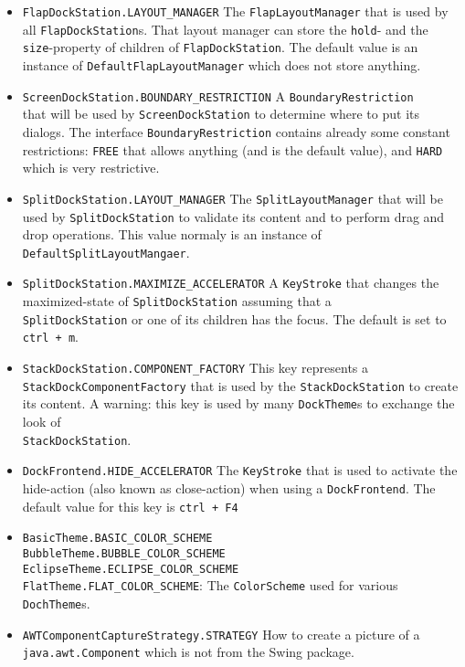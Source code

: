 \documentclass[a4paper,10pt]{article}
\newcommand{\src}[1]{\lstinline[basicstyle=\normalsize\ttfamily,keywordstyle=\normalsize\ttfamily,identifierstyle=\normalsize\ttfamily]|#1|}
\begin{document}
\begin{itemize}
\item \src{FlapDockStation.LAYOUT_MANAGER} The \src{FlapLayoutManager} that is used by all \src{FlapDockStation}s. That layout manager can store the \src{hold}- and the \src{size}-property of children of \src{FlapDockStation}. The default value is an instance of \src{DefaultFlapLayoutManager} which does not store anything.
\item \src{ScreenDockStation.BOUNDARY_RESTRICTION} A \src{BoundaryRestriction} \\that will be used by \src{ScreenDockStation} to determine where to put its dialogs. The interface \src{BoundaryRestriction} contains already some constant restrictions: \src{FREE} that allows anything (and is the default value), and \src{HARD} which is very restrictive.
\item \src{SplitDockStation.LAYOUT_MANAGER} The \src{SplitLayoutManager} that will be used by \src{SplitDockStation} to validate its content and to perform drag and drop operations. This value normaly is an instance of \\\src{DefaultSplitLayoutMangaer}. 
\item \src{SplitDockStation.MAXIMIZE_ACCELERATOR} A \src{KeyStroke} that changes the maximized-state of \src{SplitDockStation} assuming that a \\\src{SplitDockStation} or one of its children has the focus. The default is set to \src{ctrl + m}.
\item \src{StackDockStation.COMPONENT_FACTORY} This key represents a \\\src{StackDockComponentFactory} that is used by the \src{StackDockStation} to create its content. A warning: this key is used by many \src{DockTheme}s to exchange the look of \\\src{StackDockStation}.
\item \src{DockFrontend.HIDE_ACCELERATOR} The \src{KeyStroke} that is used to activate the hide-action (also known as close-action) when using a \src{DockFrontend}. The default value for this key is \src{ctrl + F4}
\item \src{BasicTheme.BASIC_COLOR_SCHEME} \\\src{BubbleTheme.BUBBLE_COLOR_SCHEME} \\\src{EclipseTheme.ECLIPSE_COLOR_SCHEME} \\\src{FlatTheme.FLAT_COLOR_SCHEME}: The \src{ColorScheme} used for various \\\src{DochTheme}s.
\item \src{AWTComponentCaptureStrategy.STRATEGY} How to create a picture of a \src{java.awt.Component} which is not from the Swing package.
\end{itemize}
\end{document}
